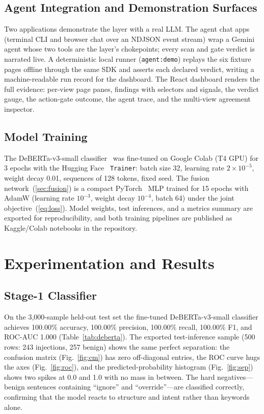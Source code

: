 \documentclass[journal]{IEEEtran}
\begin{document}
\subsection{Agent Integration and Demonstration Surfaces}
Two applications demonstrate the layer with a real LLM. The agent chat apps
(terminal CLI and browser chat over an NDJSON event stream) wrap a Gemini
agent whose two tools are the layer's chokepoints; every scan and gate
verdict is narrated live. A deterministic local runner (\texttt{agent:demo})
replays the six fixture pages offline through the same SDK and asserts each
declared verdict, writing a machine-readable run record for the dashboard. The
React dashboard renders the full evidence: per-view page panes, findings with
selectors and signals, the verdict gauge, the action-gate outcome, the agent
trace, and the multi-view agreement inspector.

\subsection{Model Training}
The DeBERTa-v3-small classifier~\cite{he2021,debertav3} was fine-tuned on
Google Colab (T4 GPU) for 3 epochs with the Hugging
Face~\cite{wolf2020} \texttt{Trainer}: batch size 32, learning rate
$2\times10^{-5}$, weight decay 0.01, sequences of 128 tokens, fixed seed. The
fusion network~(\ref{sec:fusion}) is a compact PyTorch~\cite{paszke2019} MLP
trained for 15 epochs with AdamW (learning rate $10^{-3}$, weight decay
$10^{-4}$, batch 64) under the joint objective~(\ref{eq:loss}). Model weights,
test inferences, and a metrics summary are exported for reproducibility, and
both training pipelines are published as Kaggle/Colab notebooks in the
repository.

\section{Experimentation and Results}
\label{sec:results}

\subsection{Stage-1 Classifier}
On the 3{,}000-sample held-out test set the fine-tuned DeBERTa-v3-small
classifier achieves 100.00\% accuracy, 100.00\% precision, 100.00\% recall,
100.00\% F1, and ROC-AUC 1.000 (Table~\ref{tab:deberta}). The exported
test-inference sample (500 rows: 243 injections, 257 benign) shows the same
perfect separation: the confusion matrix (Fig.~\ref{fig:cm}) has zero
off-diagonal entries, the ROC curve hugs the axes (Fig.~\ref{fig:roc}), and
the predicted-probability histogram (Fig.~\ref{fig:sep}) shows two spikes at
0.0 and 1.0 with no mass in between. The hard negatives---benign sentences
containing ``ignore'' and ``override''---are classified correctly, confirming
that the model reacts to structure and intent rather than keywords alone.
\end{document}
